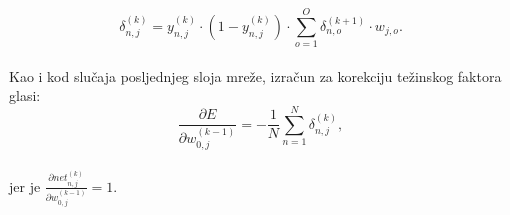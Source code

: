 \begin{equation}
    \delta_{n, j}^{(k)} = y_{n, j}^{(k)} \cdot (1 - y_{n, j}^{(k)}) \cdot \sum_{o = 1}^{O} \delta_{n, o}^{(k + 1)} \cdot
    w_{j, o}.\label{eq:hiddel-layer-delta}
\end{equation}\\
Kao i kod slučaja posljednjeg sloja mreže, izračun za korekciju težinskog faktora glasi:\\
\begin{equation}
    \frac{\partial E}{\partial w_{0, j}^{(k - 1)}} = -\frac{1}{N} \sum_{n = 1}^{N} \delta_{n, j}^{(k)},
    \label{eq:error-partial-w0-hidden-layer}
\end{equation}\\
jer je $\frac{\partial net_{n, j}^{(k)}}{\partial w_{0, j}^{(k - 1)}} = 1$.

